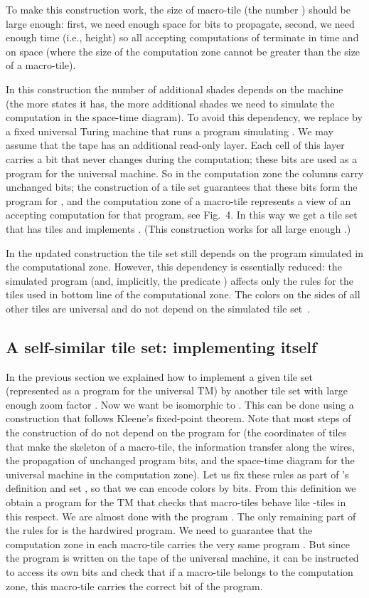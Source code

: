 \documentclass[runningheads]{llncs}
\begin{document}
  To make this construction work, the size of macro-tile (the number ) should be large enough: first, we need enough space for  bits to propagate, second, we need enough time (i.e., height) so all accepting computations of  terminate in time  and on space  (where the size of the computation zone  cannot be greater than the size of a macro-tile).
 
In this construction the number of additional shades depends on the machine  (the more states it has, the more additional shades we need to simulate the computation in the space-time diagram). To avoid this dependency, we replace  by a fixed universal Turing machine  that runs a program simulating .  We may assume that the tape has an additional read-only layer. Each cell of this layer carries a bit that never  changes during the computation; these bits are used as a program for the universal machine. So in the computation zone the columns carry unchanged bits; the construction of a tile set  guarantees that these bits form the program for , and the computation zone of a macro-tile represents a view of an accepting computation for that program, see Fig.~4. In this way we get a tile set  that has  tiles and implements . (This construction works for all large enough .)


In the updated construction the tile set still depends on the program simulated in the computational zone. However, this dependency is essentially reduced: the simulated program (and, implicitly, the predicate ) affects only the rules for the tiles used in bottom line of the computational zone. The colors on the sides of all other tiles are universal and do not depend on the simulated tile set~.

\subsection{A self-similar tile set:  implementing itself}


In the previous section we explained  how to implement a given tile set  (represented as a program for the universal TM) by another tile set  with large enough zoom factor . Now we want  be isomorphic to . This can be done using a construction that follows Kleene's fixed-point theorem.
Note that most steps of the construction of   do not depend on the program for  (the coordinates of tiles that make the skeleton of a macro-tile, the information transfer along the wires, the propagation of unchanged program bits, and the space-time diagram for the universal machine in the computation zone). Let us fix these rules as part of 's definition and set , so that we can encode  colors by  bits.  From this definition we  obtain a program  for the TM  that checks that macro-tiles behave like -tiles in this respect. We are almost done with the program . The only remaining part of the rules for  is the hardwired program. We need to guarantee that the computation zone in each macro-tile carries the very same program . But since the program is written on the tape of the universal machine, it can be instructed to access its own bits and check that if a macro-tile belongs to the computation zone, this macro-tile carries the correct bit of the program.
\end{document}
